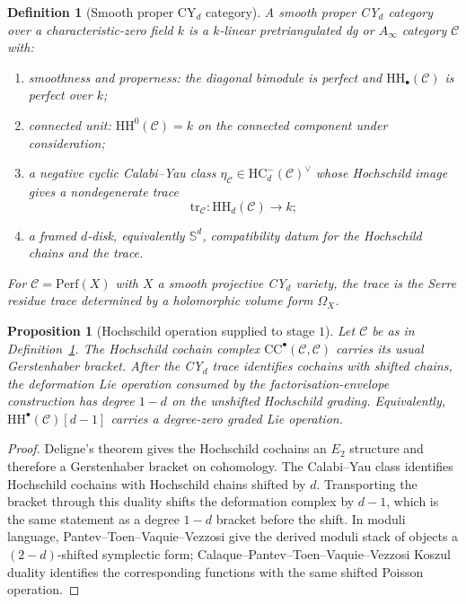 \documentclass[11pt]{article}
\newtheorem{proposition}[theorem]{Proposition}
\newtheorem{definition}[theorem]{Definition}
\providecommand{\HH}{\mathrm{HH}}
\providecommand{\HC}{\mathrm{HC}}
\providecommand{\Perf}{\mathrm{Perf}}
\providecommand{\Ainf}{A_{\infty}}
\providecommand{\bS}{\mathbb{S}}
\providecommand{\cC}{\mathcal{C}}
\begin{document}
\begin{definition}[Smooth proper CY$_d$ category]
\label{def:cy-d-category}
A \emph{smooth proper CY$_d$ category} over a characteristic-zero field
$k$ is a $k$-linear pretriangulated dg or $\Ainf$ category $\cC$ with:
\begin{enumerate}[label=\textup{(H\arabic*)}]
 \item smoothness and properness: the diagonal bimodule is perfect and
 $\HH_\bullet(\cC)$ is perfect over $k$;
 \item connected unit: $\HH^0(\cC)=k$ on the connected component under
 consideration;
 \item a negative cyclic Calabi--Yau class
 $\eta_\cC\in \HC^-_d(\cC)^\vee$ whose Hochschild image gives a
 nondegenerate trace
 \[
  \mathrm{tr}_\cC\colon \HH_d(\cC)\longrightarrow k;
 \]
 \item a framed $d$-disk, equivalently $\bS^d$, compatibility datum for
 the Hochschild chains and the trace.
\end{enumerate}
For $\cC=\Perf(X)$ with $X$ a smooth projective CY$_d$ variety, the trace
is the Serre residue trace determined by a holomorphic volume form
$\Omega_X$.
\end{definition}

\begin{proposition}[Hochschild operation supplied to stage $1$]
\label{prop:hoch-operation-stage-one}
Let $\cC$ be as in Definition~\ref{def:cy-d-category}.  The Hochschild
cochain complex $\mathrm{CC}^\bullet(\cC,\cC)$ carries its usual
Gerstenhaber bracket.  After the CY$_d$ trace identifies cochains with
shifted chains, the deformation Lie operation consumed by the
factorisation-envelope construction has degree $1-d$ on the unshifted
Hochschild grading.  Equivalently,
$\HH^\bullet(\cC)[d-1]$ carries a degree-zero graded Lie operation.
\end{proposition}

\begin{proof}
Deligne's theorem gives the Hochschild cochains an $E_2$ structure and
therefore a Gerstenhaber bracket on cohomology.  The Calabi--Yau class
identifies Hochschild cochains with Hochschild chains shifted by $d$.
Transporting the bracket through this duality shifts the deformation
complex by $d-1$, which is the same statement as a degree $1-d$ bracket
before the shift.  In moduli language, Pantev--Toen--Vaquie--Vezzosi give
the derived moduli stack of objects a $(2-d)$-shifted symplectic form;
Calaque--Pantev--Toen--Vaquie--Vezzosi Koszul duality identifies the
corresponding functions with the same shifted Poisson operation.
\end{proof}
\end{document}

